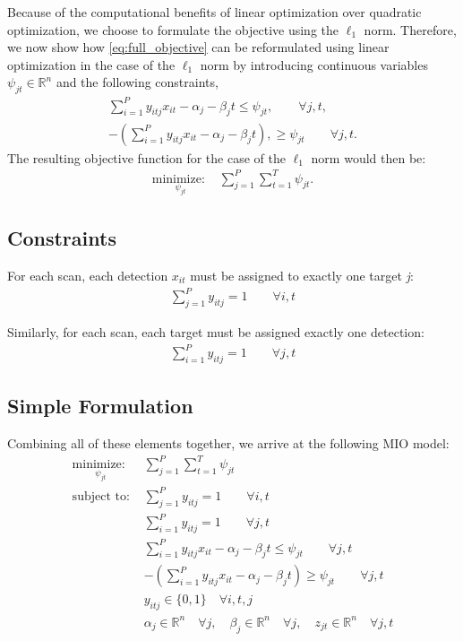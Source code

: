 Because of the computational benefits of linear optimization over quadratic optimization, we choose to formulate the objective using the $\ell_1$ norm. Therefore, we now show how \eqref{eq:full_objective} can be reformulated using linear optimization in the case of the $\ell_1$ norm by introducing continuous variables $\psi_{jt} \in \mathbb{R}^n$ and the following constraints,
\begin{align}
\sum_{i=1}^{P}y_{itj}x_{it} - \alpha_{j} - \beta_{j}t \leq \psi_{jt}, \qquad \forall j,t,\\
-\left(\sum_{i=1}^{P}y_{itj}x_{it} - \alpha_{j} - \beta_{j}t\right), \geq \psi_{jt} \qquad \forall j,t.
\end{align}
The resulting objective function for the case of the $\ell_1$ norm would then be:
\begin{align}
\underset{\psi_{jt}}{\text{minimize: }} & \sum_{j=1}^{P} \sum_{t=1}^{T} \psi_{jt}.
\end{align}


\subsection{Constraints}
For each scan, each detection $x_{it}$ must be assigned to exactly one target \textit{j}:
\begin{align}
\sum_{j=1}^{P} y_{itj} = 1 \qquad \forall i,t
\end{align}

Similarly, for each scan, each target must be assigned exactly one detection:
\begin{align}
\sum_{i=1}^{P} y_{itj} = 1 \qquad \forall j,t
\end{align}

\subsection{Simple Formulation}
Combining all of these elements together, we arrive at the following MIO model:
\begin{align*}
\underset{\psi_{jt}}{\text{minimize: }} & \sum_{j=1}^{P} \sum_{t=1}^{T} \psi_{jt} \\
\text{subject to: }	& \sum_{j=1}^{P} y_{itj} = 1 \qquad \forall i,t\\
				& \sum_{i=1}^{P} y_{itj} = 1 \qquad \forall j,t\\
				& \sum_{i=1}^{P}y_{itj}x_{it} - \alpha_{j} - \beta_{j}t \leq \psi_{jt} \qquad \forall j,t\\
				& -\left(\sum_{i=1}^{P}y_{itj}x_{it} - \alpha_{j} - \beta_{j}t\right) \geq \psi_{jt} \qquad \forall j,t\\
			 	& y_{itj} \in \{0,1\} \quad \forall i,t,j\\
				& \alpha_{j} \in \mathbb{R}^n \quad \forall j,\quad \beta_{j} \in \mathbb{R}^n \quad \forall j, \quad z_{jt} \in \mathbb{R}^n \quad \forall j,t
\end{align*}

